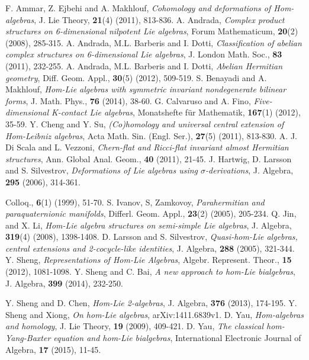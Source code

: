 \documentclass[10pt]{amsart}
\numberwithin{equation}{section}
\begin{document}
\begin{thebibliography}{99}
 F. Ammar, Z. Ejbehi and A. Makhlouf, {\it Cohomology and deformations of Hom-algebras}, J. Lie Theory,  {\bf 21}(4) (2011), 813-836.
 A. Andrada, {\it Complex product structures on 6-dimensional nilpotent Lie algebras}, Forum Mathematicum, {\bf 20}(2) (2008), 285-315. 
 A. Andrada, M.L. Barberis and I. Dotti, {\it Classification of abelian complex structures on 6-dimensional Lie algebras}, J. London Math. Soc., {\bf 83} (2011), 232-255.
 A. Andrada, M.L. Barberis and I. Dotti, {\it Abelian Hermitian geometry},  Diff. Geom. Appl., {\bf 30}(5) (2012), 509-519. 
  S. Benayadi and A. Makhlouf, {\it Hom-Lie algebras with symmetric invariant nondegenerate bilinear forms}, J. Math. Phys.,  {\bf 76} (2014), 38-60. 
 G. Calvaruso and A. Fino, {\it Five-dimensional K-contact Lie algebras}, Monatshefte f\"{u}r Mathematik, {\bf 167}(1) (2012), 35-59.
 Y. Cheng and Y. Su, {\it (Co)homology and universal central extension of Hom-Leibniz algebras}, Acta Math. Sin. (Engl. Ser.),  {\bf 27}(5) (2011), 813-830. 
 A. J. Di Scala and L. Vezzoni, {\it Chern-flat and Ricci-flat invariant almost Hermitian structures}, Ann. Global Anal. Geom., {\bf 40} (2011), 21-45.
 J. Hartwig, D. Larsson and S. Silvestrov, {\it Deformations of Lie algebras using $\sigma$-derivations}, J. Algebra, {\bf 295} (2006), 314-361.
 
Colloq., {\bf 6}(1) (1999), 51-70.
 S. Ivanov, S, Zamkovoy, {\it Parahermitian and paraquaternionic manifolds}, Differl. Geom. Appl., {\bf 23}(2) (2005), 205-234.
 Q. Jin, and X. Li, {\it Hom-Lie algebra structures on semi-simple Lie algebras}, J. Algebra, {\bf 319}(4) (2008), 1398-1408.
 D. Larsson and S. Silvestrov, {\it Quasi-hom-Lie algebras, central extensions and 2-cocycle-like
	identities}, J. Algebra, {\bf 288} (2005), 321-344.
 Y. Sheng, {\it Representations of Hom-Lie Algebras},  Algebr. Represent. Theor., {\bf 15} (2012), 1081-1098.
 Y. Sheng and C. Bai, {\it A new approach to hom-Lie bialgebras}, J. Algebra,  {\bf 399} (2014), 232-250. 

 Y. Sheng and D. Chen, {\it Hom-Lie 2-algebras}, J. Algebra,  {\bf 376} (2013), 174-195.
 Y. Sheng and Xiong, {\it On hom-Lie algebras}, arXiv:1411.6839v1.
 D. Yau, {\it Hom-algebras and homology}, J. Lie Theory,  {\bf 19} (2009), 409-421.
 D. Yau, {\it The classical hom-Yang-Baxter equation and hom-Lie bialgebras}, International Electronic Journal of Algebra, {\bf 17} (2015), 11-45.

\end{thebibliography}
\end{document}
